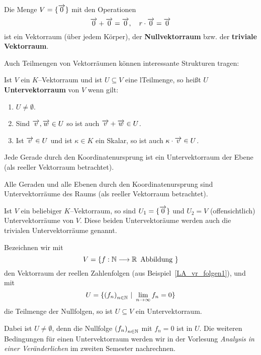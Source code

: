 \begin{beispiel}
Die Menge $V = \{ \overrightarrow{0}\}$ mit den Operationen 
	$$ \overrightarrow{0} + \overrightarrow{0} = \overrightarrow{0}, \quad r \cdot \overrightarrow{0} = \overrightarrow{0} $$
ist ein Vektorraum (über jedem Körper), der \textbf{Nullvektorraum} bzw. der \textbf{triviale Vektorraum}. 
\end{beispiel}

Auch Teilmengen von Vektorräumen können interessante Strukturen tragen:

\begin{definition} Ist $V$ ein $K$--Vektorraum und  ist $U \subseteq V$ eine 
lTeilmenge, so heißt $U$ 
\textbf{Untervektorraum} von $V$ wenn gilt:

\begin{enumerate}
\item $U \neq \emptyset$. 
\item Sind $\overrightarrow{v}, \overrightarrow{w} \in U$ so ist auch 
$\overrightarrow{v} + \overrightarrow{w} \in U$.
\item Ist $\overrightarrow{v} \in U$ und ist $\kappa \in K$ ein Skalar, so ist 
auch $\kappa \cdot \overrightarrow{v} \in U$.
\end{enumerate}
\end{definition}

\begin{beispiel}\label{uvr_ebene}
Jede Gerade durch den Koordinatenursprung ist ein Untervektorraum der Ebene (als reeller Vektorraum betrachtet). 

Alle Geraden und alle Ebenen durch den Koordinatenursprung sind Untervektorräume des Raums (als reeller 
Vektorraum betrachtet). 
\end{beispiel}

\begin{beispiel}
Ist $V$ ein beliebiger $K$--Vektorraum, so sind $U_1 = \{\overrightarrow{0} \}$ und $U_2 = V$ (offensichtlich) 
Untervektorräume von $V$. Diese beiden Untervektoräume werden auch die trivialen Untervektorräume genannt. 
\end{beispiel}

\begin{beispiel} 
Bezeichnen wir mit 
	$$ V  = \{ f: \mathbb N \longrightarrow \mathbb R \, \text{ Abbildung }\} $$
den Vektorraum der reellen Zahlenfolgen (aus Beispiel~\ref{LA_vr_folgen1}), und mit 
	$$ U = \{ \left(f_n\right)_{n \in \mathbb N} \,\vert \,\, \lim\limits_{n \to \infty} f_n = 0 \} $$
die Teilmenge der Nullfolgen, so ist $U \subseteq V$ ein Untervektorraum. 

Dabei ist $ U \neq \emptyset$, denn die Nullfolge $\left( f_n \right)_{n \in \mathbb N}$ mit $f_n = 0$ ist in $U$. 
Die weiteren Bedingungen für einen Untervektorraum werden wir in der Vorlesung \textit{Analysis in einer 
Veränderlichen} im zweiten Semester nachrechnen.
\end{beispiel} 

